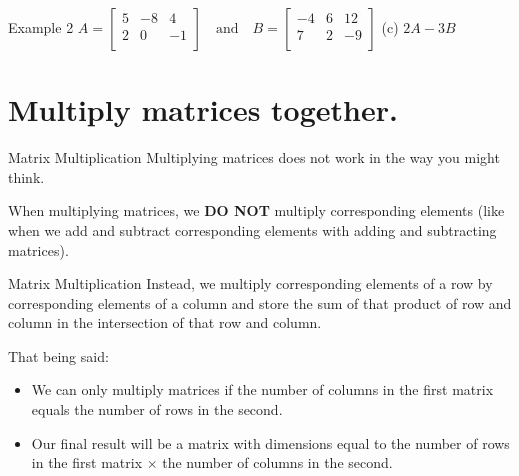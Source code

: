 \documentclass[t]{beamer}
\begin{document}
\begin{frame}{Example 2 \quad $A =
\begin{bmatrix}
5   &   -8  &   4   \\
2   &   0   &   -1  \\
\end{bmatrix}
\quad \text{and} \quad
B = 
\begin{bmatrix}
-4  &   6   &   12  \\
7   &   2   &   -9  \\
\end{bmatrix}$}
(c) \quad $2A - 3B$
\end{frame}

\section{Multiply matrices together.}

\begin{frame}{Matrix Multiplication}
Multiplying matrices does not work in the way you might think. \newline\\ \pause

When multiplying matrices, we {\color{blue}\textbf{DO NOT}} multiply corresponding elements (like when we add and subtract corresponding elements with adding and subtracting matrices).
\end{frame}

\begin{frame}{Matrix Multiplication}
Instead, we multiply corresponding elements of a row by corresponding elements of a column and store the sum of that product of row and column in the intersection of that row and column. \newline\\ \pause

That being said: \pause
\begin{itemize}
    \item We can only multiply matrices if the number of columns in the first matrix equals the number of rows in the second. \pause
    \item Our final result will be a matrix with dimensions equal to the number of rows in the first matrix $\times$ the number of columns in the second.
\end{itemize}
\end{frame}
\end{document}
